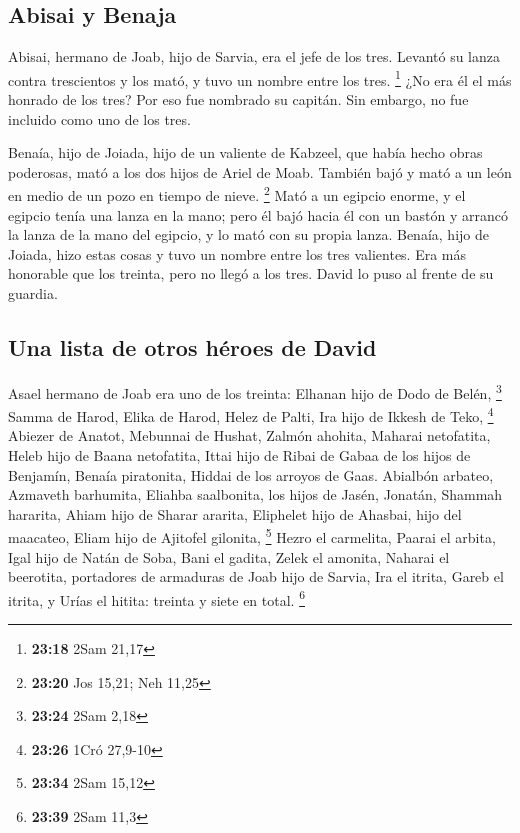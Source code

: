 \begin{paracol}{2}
\hypertarget{abisai-y-benaja}{%
\subsection{Abisai y Benaja}\label{abisai-y-benaja}}

 Abisai, hermano de Joab, hijo de Sarvia, era el jefe de
los tres. Levantó su lanza contra trescientos y los mató, y tuvo un
nombre entre los tres. \footnote{\textbf{23:18} 2Sam 21,17}
 ¿No era él el más honrado de los tres? Por eso fue
nombrado su capitán. Sin embargo, no fue incluido como uno de los tres.

 Benaía, hijo de Joiada, hijo de un valiente de Kabzeel,
que había hecho obras poderosas, mató a los dos hijos de Ariel de Moab.
También bajó y mató a un león en medio de un pozo en tiempo de nieve.
\footnote{\textbf{23:20} Jos 15,21; Neh 11,25}  Mató a un
egipcio enorme, y el egipcio tenía una lanza en la mano; pero él bajó
hacia él con un bastón y arrancó la lanza de la mano del egipcio, y lo
mató con su propia lanza.  Benaía, hijo de Joiada, hizo
estas cosas y tuvo un nombre entre los tres valientes. 
Era más honorable que los treinta, pero no llegó a los tres. David lo
puso al frente de su guardia.

\hypertarget{una-lista-de-otros-huxe9roes-de-david}{%
\subsection{Una lista de otros héroes de
David}\label{una-lista-de-otros-huxe9roes-de-david}}

 Asael hermano de Joab era uno de los treinta: Elhanan
hijo de Dodo de Belén, \footnote{\textbf{23:24} 2Sam 2,18}
 Samma de Harod, Elika de Harod,  Helez de
Palti, Ira hijo de Ikkesh de Teko, \footnote{\textbf{23:26} 1Cró 27,9-10}
 Abiezer de Anatot, Mebunnai de Hushat, 
Zalmón ahohita, Maharai netofatita,  Heleb hijo de Baana
netofatita, Ittai hijo de Ribai de Gabaa de los hijos de Benjamín,
 Benaía piratonita, Hiddai de los arroyos de Gaas.
 Abialbón arbateo, Azmaveth barhumita, 
Eliahba saalbonita, los hijos de Jasén, Jonatán,  Shammah
hararita, Ahiam hijo de Sharar ararita,  Eliphelet hijo
de Ahasbai, hijo del maacateo, Eliam hijo de Ajitofel gilonita,
\footnote{\textbf{23:34} 2Sam 15,12}  Hezro el carmelita,
Paarai el arbita,  Igal hijo de Natán de Soba, Bani el
gadita,  Zelek el amonita, Naharai el beerotita,
portadores de armaduras de Joab hijo de Sarvia,  Ira el
itrita, Gareb el itrita,  y Urías el hitita: treinta y
siete en total. \footnote{\textbf{23:39} 2Sam 11,3}


\end{paracol}
